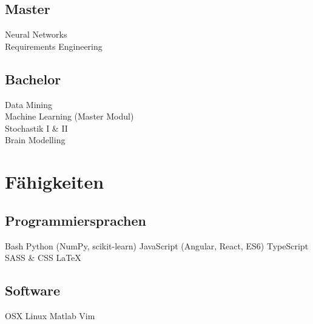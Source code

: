 \documentclass[]{deedy-resume-openfont}
\begin{document}
\begin{minipage}[t]{0.33\textwidth}
\subsection{Master}
Neural Networks \\
Requirements Engineering \\
\sectionsep

\subsection{Bachelor}
Data Mining \\
Machine Learning (Master Modul) \\
Stochastik I \& II \\ 
Brain Modelling


\section{Fähigkeiten}
\subsection{Programmiersprachen}
Bash \textbullet{} Python (NumPy, scikit-learn) \textbullet{} JavaScript (Angular, React, ES6) \textbullet{} TypeScript \textbullet{} SASS \& CSS \textbullet{} \LaTeX \textbullet{}
\sectionsep

\subsection{Software}
OSX \textbullet{} Linux \textbullet{} Matlab \textbullet{}
Vim

%
%

\end{minipage} 
\hfill
\end{document}
